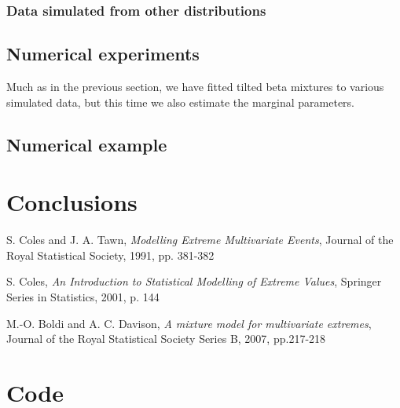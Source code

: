 \documentclass[10pt]{report}
\begin{document}
\subsection{Data simulated from other distributions}
\label{sec:wrongdist}

\section{Numerical experiments}
Much as in the previous section, we have fitted tilted beta mixtures to various simulated data, but this time we also estimate the marginal parameters.

\section{Numerical example}

\chapter{Conclusions}

\begin{thebibliography}{9}

S. Coles and J. A. Tawn, \textit{Modelling Extreme Multivariate Events}, Journal of the Royal Statistical Society, 1991, pp. 381-382

S. Coles, \textit{An Introduction to Statistical Modelling of Extreme Values}, Springer Series in Statistics, 2001, p. 144


M.-O. Boldi and A. C. Davison, \textit{A mixture model for multivariate extremes}, Journal of the Royal Statistical Society Series B,  2007, pp.217-218

\end{thebibliography}


\chapter*{Code}



\end{document}
